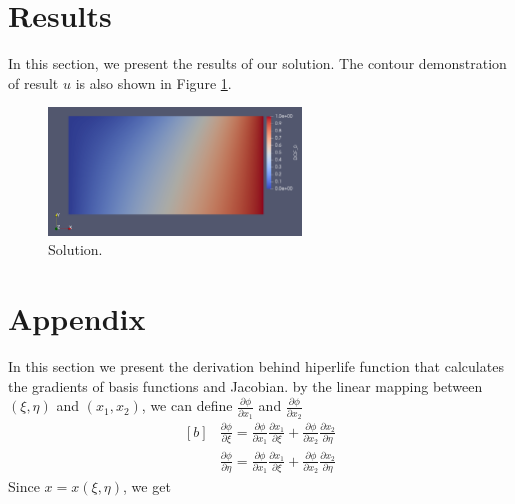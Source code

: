 \documentclass[]{article}
\begin{document}
\section{Results} \label{sec: rst}
In this section, we present the results of our solution. The contour demonstration of result $u$ is also shown in Figure \ref{fig_rst}.
\begin{figure}[htbp]
	\centering
	\includegraphics[width=0.6\textwidth]{Figures/result.png}
	\caption{Solution.}
	\label{fig_rst}
\end{figure}

\pagebreak
\section*{Appendix} \label{sec: apx}
In this section we present the derivation behind hiperlife function that calculates the gradients of basis functions and Jacobian.
by the linear mapping between $(\xi,\eta)$ and $(x_{1},x_2)$, we can define $\frac{\partial \phi}{\partial x_{1}}$ and $\frac{\partial \phi}{\partial x_{2}}$
\begin{equation}\label{eq14}
	\begin{aligned}[b]
		&
		\frac{\partial \phi}{\partial \xi} = \frac{\partial \phi}{\partial x_{1}}\frac{\partial x_{1}}{\partial \xi}+\frac{\partial \phi}{\partial x_{2}}\frac{\partial x_{2}}{\partial \eta}\\
		& 
		\frac{\partial \phi}{\partial \eta} = \frac{\partial \phi}{\partial x_{1}}\frac{\partial x_{1}}{\partial \xi}+\frac{\partial \phi}{\partial x_{2}}\frac{\partial x_{2}}{\partial \eta}
	\end{aligned}
\end{equation}
Since $x=x(\xi,\eta)$, we get
\end{document}
